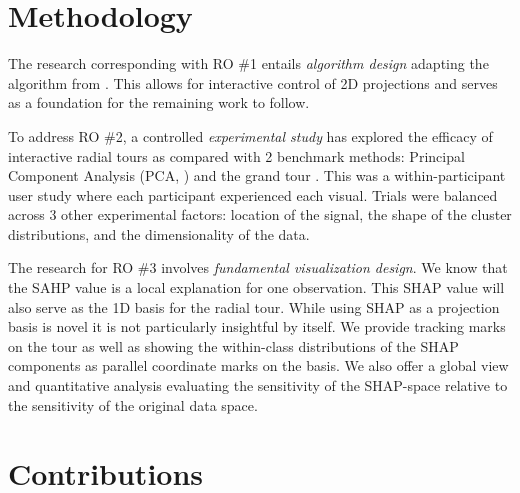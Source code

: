 \documentclass{template/monashthesis}
\begin{document}
\hypertarget{methodology}{%
\section{Methodology}\label{methodology}}

The research corresponding with RO \#1 entails \emph{algorithm design} adapting the algorithm from \textcite{cook_manual_1997}. This allows for interactive control of 2D projections and serves as a foundation for the remaining work to follow.

To address RO \#2, a controlled \emph{experimental study} has explored the efficacy of interactive radial tours as compared with 2 benchmark methods: Principal Component Analysis (PCA, \textcite{pearson_liii._1901}) and the grand tour \autocite{asimov_grand_1985}. This was a within-participant user study where each participant experienced each visual. Trials were balanced across 3 other experimental factors: location of the signal, the shape of the cluster distributions, and the dimensionality of the data.

The research for RO \#3 involves \emph{fundamental visualization design}. We know that the SAHP value is a local explanation for one observation. This SHAP value will also serve as the 1D basis for the radial tour. While using SHAP as a projection basis is novel it is not particularly insightful by itself. We provide tracking marks on the tour as well as showing the within-class distributions of the SHAP components as parallel coordinate marks on the basis. We also offer a global view and quantitative analysis evaluating the sensitivity of the SHAP-space relative to the sensitivity of the original data space.

\hypertarget{contributions}{%
\section{Contributions}\label{contributions}}
\end{document}
